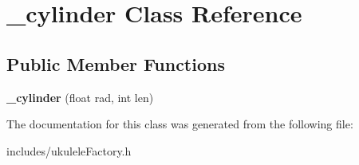 \hypertarget{class__cylinder}{}\section{\+\_\+cylinder Class Reference}
\label{class__cylinder}
\subsection*{Public Member Functions}
\begin{DoxyCompactItemize}
\item 
\hypertarget{class__cylinder_a635c91e7b9b5273355f9d53b80a5f370}{}\label{class__cylinder_a635c91e7b9b5273355f9d53b80a5f370} 
{\bfseries \+\_\+cylinder} (float rad, int len)
\end{DoxyCompactItemize}


The documentation for this class was generated from the following file\+:\begin{DoxyCompactItemize}
\item 
includes/ukulele\+Factory.\+h\end{DoxyCompactItemize}
